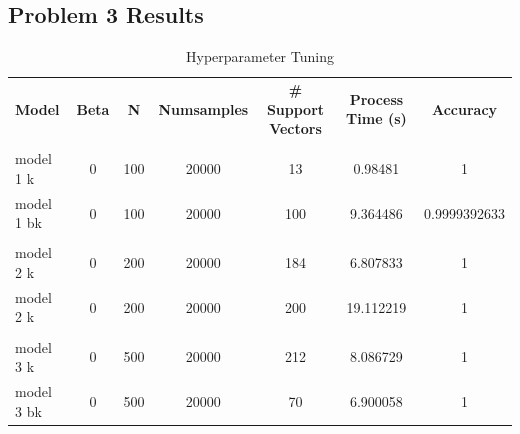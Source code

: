 \documentclass[submit]{harvardml}
\begin{document}
\newpage

\subsection*{Problem 3 Results}

\begin{table}[htb]
	\centering
	\caption{Hyperparameter Tuning}
	\label{my-label}
	\begin{tabular}{lcccccc}
		\textbf{Model} & \textbf{Beta}                & \textbf{N}                 & \textbf{Numsamples}          & \textbf{\# Support Vectors} & \textbf{Process Time (s)} & \textbf{Accuracy}    \\
		& \multicolumn{1}{l}{}         & \multicolumn{1}{l}{}       & \multicolumn{1}{l}{}         & \multicolumn{1}{l}{}        & \multicolumn{1}{l}{}  & \multicolumn{1}{l}{} \\
		model 1 k                            & 0                            & 100                        & 20000                        & 13                          & 0.98481               & 1                    \\
		model 1 bk                           & 0                            & 100                        & 20000                        & 100                         & 9.364486              & 0.9999392633         \\
		&                              &                            &                              &                             &                       &                      \\
		model 2 k                            & 0                            & {\color[HTML]{3166FF} 200} & 20000                        & 184                         & 6.807833              & 1                    \\
		model 2 k                            & 0                            & {\color[HTML]{3166FF} 200} & 20000                        & 200                         & 19.112219             & 1                    \\
		&                              &                            &                              &                             &                       &                      \\
		model 3 k                            & 0                            & {\color[HTML]{3166FF} 500} & 20000                        & 212                         & 8.086729              & 1                    \\
		model 3 bk                           & 0                            & {\color[HTML]{3166FF} 500} & 20000                        & 70                          & 6.900058              & 1                    \\

\end{tabular}
\end{table}
\end{document}
